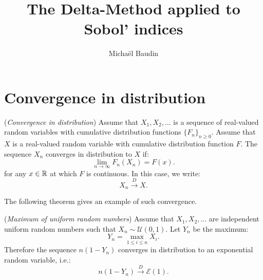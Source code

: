 \documentclass{article}
\begin{document}
\title{The Delta-Method applied to Sobol' indices}

\author{Michaël Baudin}

\maketitle



\tableofcontents


\section{Convergence in distribution}

\begin{definition}
\label{def-convdistr}
(\emph{Convergence in distribution})
Assume that $X_1,X_2,...$ is a sequence of real-valued random variables 
with cumulative distribution functions $\{F_n\}_{n\geq 0}$. 
Assume that $X$ is a real-valued random variable 
with cumulative distribution function $F$. 
The sequence $X_n$ converges in distribution to $X$ if:
$$
\lim_{n\rightarrow \infty} F_n(X_n)=F(x).
$$
for any $x\in \mathbb{R}$ at which $F$ is continuous.
In this case, we write:
$$
X_n \xrightarrow{D} X.
$$
\end{definition}

The following theorem gives an example of such convergence. 

\begin{example}
(\emph{Maximum of uniform random numbers})
Assume that $X_1,X_2,...$ are independent uniform random numbers such that $X_n\sim \mathcal{U} (0,1)$. 
Let $Y_n$ be the maximum:
$$
Y_n = \max_{1\leq i\leq n}  X_i.
$$
Therefore the sequence $n(1-Y_n)$ converges in distribution to an exponential random variable, i.e.:
$$
n(1-Y_n) \xrightarrow{D} \mathcal{E}(1).
$$
\end{example}
\end{document}
